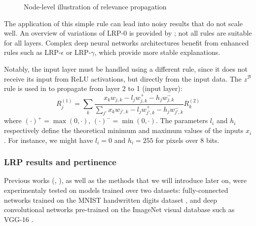 \documentclass{../cs-classes/cs-classes}
\newcommand*{\1}{\digitsbb{1}}
\newcommand*{\0}{\digitsbb{0}}
\begin{document}
\begin{figure}[H]
    \centering
    \caption{Node-level illustration of relevance propagation}
\end{figure}

The application of this simple rule can lead into noisy results that do not scale well. An overview of variations of LRP-0 is provided by \cite{montavon-lrp}; not all rules are suitable for all layers. Complex deep neural networks architectures benefit from enhanced rules such as LRP-$\epsilon$ or LRP-$\gamma$, which provide more stable explanations.

Notably, the input layer must be handled using a different rule, since it does not receive its input from ReLU activations, but directly from the input data. The $z^\mathcal{B}$ rule is used in \cite{montavon-lrp} to propagate from layer 2 to 1 (input layer):
\begin{equation}
    R^{(1)}_j = \sum_{k} \frac{x_kw_{j, k} - l_jw^+_{j, k} - h_jw_{j, k}^-}{\sum_{j'}x_kw_{j', k} - l_jw^+_{j', k} - h_jw_{j', k}^-} R^{(2)}_k
\end{equation}
where $(\cdot)^+=\max(0, \cdot)$, $(\cdot)^-=\min(0, \cdot)$. The parameters $l_i$ and $h_i$ respectively define the theoretical minimum and maximum values of the inputs $x_i$. For instance, we might have $l_i=0$ and $h_i=255$ for pixels over 8 bits.

\subsubsection{LRP results and pertinence}
Previous works (\cite{bach-2015}, \cite{montavon-lrp}), as well as the methods that we will introduce later on, were experimentaly tested on models trained over two datasets: fully-connected networks trained on the MNIST handwritten digits dataset \cite{mnist-dataset}, and deep convolutional networks pre-trained on the ImageNet visual database such as VGG-16 \cite{vgg}.
\end{document}
